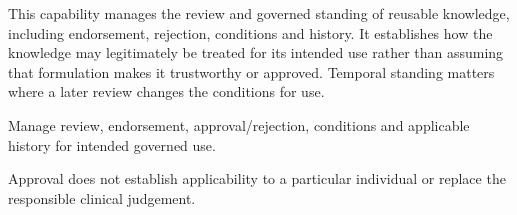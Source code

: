 This capability manages the review and governed standing of reusable knowledge, including endorsement, rejection, conditions and history. It establishes how the knowledge may legitimately be treated for its intended use rather than assuming that formulation makes it trustworthy or approved. Temporal standing matters where a later review changes the conditions for use.



Manage review, endorsement, approval/\allowbreak{}rejection, conditions and applicable history for intended governed use.



Approval does not establish applicability to a particular individual or replace the responsible clinical judgement.



